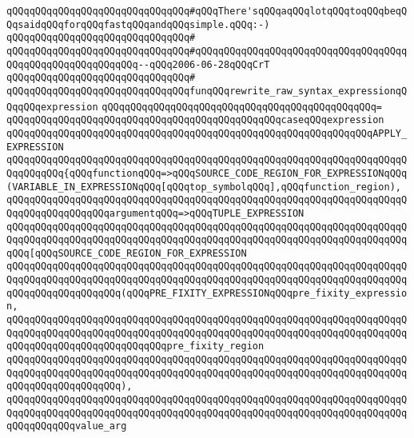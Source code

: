 \verb|qQQqqQQqqQQqqQQqqQQqqQQqqQQqqQQq#qQQqThere'sqQQqaqQQqlotqQQqtoqQQqbeqQQqsaidqQQqforqQQqfastqQQqandqQQqsimple.qQQq:-)|\newline
\verb|qQQqqQQqqQQqqQQqqQQqqQQqqQQqqQQq#|\newline
\verb|qQQqqQQqqQQqqQQqqQQqqQQqqQQqqQQq#qQQqqQQqqQQqqQQqqQQqqQQqqQQqqQQqqQQqqQQqqQQqqQQqqQQqqQQqqQQq--qQQq2006-06-28qQQqCrT|\newline
\verb|qQQqqQQqqQQqqQQqqQQqqQQqqQQqqQQq#|\newline
\verb|qQQqqQQqqQQqqQQqqQQqqQQqqQQqqQQqfunqQQqrewrite_raw_syntax_expressionqQQqqQQqexpression|\newline
\verb|qQQqqQQqqQQqqQQqqQQqqQQqqQQqqQQqqQQqqQQqqQQqqQQq=|\newline
\verb|qQQqqQQqqQQqqQQqqQQqqQQqqQQqqQQqqQQqqQQqqQQqqQQqcaseqQQqexpression|\newline
\verb|qQQqqQQqqQQqqQQqqQQqqQQqqQQqqQQqqQQqqQQqqQQqqQQqqQQqqQQqqQQqqQQqAPPLY_EXPRESSION|\newline
\verb|qQQqqQQqqQQqqQQqqQQqqQQqqQQqqQQqqQQqqQQqqQQqqQQqqQQqqQQqqQQqqQQqqQQqqQQqqQQqqQQq{qQQqfunctionqQQq=>qQQqSOURCE_CODE_REGION_FOR_EXPRESSIONqQQq(VARIABLE_IN_EXPRESSIONqQQq[qQQqtop_symbolqQQq],qQQqfunction_region),|\newline
\verb|qQQqqQQqqQQqqQQqqQQqqQQqqQQqqQQqqQQqqQQqqQQqqQQqqQQqqQQqqQQqqQQqqQQqqQQqqQQqqQQqqQQqqQQqargumentqQQq=>qQQqTUPLE_EXPRESSION|\newline
\verb|qQQqqQQqqQQqqQQqqQQqqQQqqQQqqQQqqQQqqQQqqQQqqQQqqQQqqQQqqQQqqQQqqQQqqQQqqQQqqQQqqQQqqQQqqQQqqQQqqQQqqQQqqQQqqQQqqQQqqQQqqQQqqQQqqQQqqQQqqQQqqQQq[qQQqSOURCE_CODE_REGION_FOR_EXPRESSION|\newline
\verb|qQQqqQQqqQQqqQQqqQQqqQQqqQQqqQQqqQQqqQQqqQQqqQQqqQQqqQQqqQQqqQQqqQQqqQQqqQQqqQQqqQQqqQQqqQQqqQQqqQQqqQQqqQQqqQQqqQQqqQQqqQQqqQQqqQQqqQQqqQQqqQQqqQQqqQQqqQQqqQQq(qQQqPRE_FIXITY_EXPRESSIONqQQqpre_fixity_expression,|\newline
\verb|qQQqqQQqqQQqqQQqqQQqqQQqqQQqqQQqqQQqqQQqqQQqqQQqqQQqqQQqqQQqqQQqqQQqqQQqqQQqqQQqqQQqqQQqqQQqqQQqqQQqqQQqqQQqqQQqqQQqqQQqqQQqqQQqqQQqqQQqqQQqqQQqqQQqqQQqqQQqqQQqqQQqqQQqpre_fixity_region|\newline
\verb|qQQqqQQqqQQqqQQqqQQqqQQqqQQqqQQqqQQqqQQqqQQqqQQqqQQqqQQqqQQqqQQqqQQqqQQqqQQqqQQqqQQqqQQqqQQqqQQqqQQqqQQqqQQqqQQqqQQqqQQqqQQqqQQqqQQqqQQqqQQqqQQqqQQqqQQqqQQqqQQq),|\newline
\verb|qQQqqQQqqQQqqQQqqQQqqQQqqQQqqQQqqQQqqQQqqQQqqQQqqQQqqQQqqQQqqQQqqQQqqQQqqQQqqQQqqQQqqQQqqQQqqQQqqQQqqQQqqQQqqQQqqQQqqQQqqQQqqQQqqQQqqQQqqQQqqQQqqQQqqQQqvalue_arg|\newline
